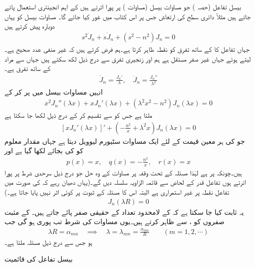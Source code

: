 بیسل تفاعل (حصہ )  جو مساوات بیسل (مساوات  ) پر پورا اترتے ہیں کے  اہم انجینئری استعمال پائے جاتے ہیں مثلاً دائری سطح کی ارتعاش جس پر اس کتاب میں غور کیا جائے گا۔ مساوات بیسل کو یہاں دوبارہ پیش کرتے ہیں
\begin{align*}
s^2\ddot{J}_n+s\dot{J}_n+(s^2-n^2)J_n=0
\end{align*}
جہاں تفاعل کا  کے ساتھ تفرق کو نقطہ ظاہر کرتا ہے۔ہم فرض کرتے ہیں کہ  غیر منفی عدد صحیح ہے۔  لیتے ہوئے جہاں  غیر صفر مستقل ہے ہم  اور زنجیری تفرق سے درج ذیل لکھ سکتے ہیں جہاں  سے مراد  کے ساتھ تفرق ہے۔
\begin{align*}
\dot{J}_n=\frac{J_n'}{\lambda}, \quad \ddot{J}_n=\frac{J_n''}{\lambda^2}
\end{align*}
انہیں مساوات بیسل میں پر کر کے
\begin{align*}
x^2J_n''(\lambda x)+xJ_n'(\lambda x)+(\lambda^2 x^2-n^2)J_n(\lambda x)=0
\end{align*}
ملتا ہے جس کو  سے تقسیم کر کے درج ذیل لکھا جا سکتا ہے
\begin{align}\label{مساوات_طاقتی_بیسل_سٹیورم_الف}
[xJ_n'(\lambda x)]'+\left(-\frac{n^2}{x}+\lambda^2 x\right)J_n(\lambda x)=0
\end{align}
جو  کی ہر معین قیمت کے لئے ایک مساوات سٹیورم لیوویل دیتا ہے جہاں مقدار معلوم کو  کی بجائے  لکھا گیا ہے اور 
\begin{align*}
p(x)=x,\quad q(x)=-\frac{n^2}{x},\quad r(x)=x
\end{align*}
ہیں۔چونکہ  پر  ہے لہٰذا مسئلہ  کے تحت وقفہ  پر مساوات  کے وہ حل جو درج ذیل سرحدی شرط پر پورا اترتے ہوں تفاعل قدر  کے لحاض سے  قائمہ الزاویہ سلسلہ دیں گے۔(یہاں دھیان رہے کہ  کی صورت میں تفاعل  نقطہ  پر غیر استمراری ہے البتہ اس کا مسئلہ  کے ثبوت پر کوئی اثر نہیں پایا جاتا ہے۔)
\begin{align}\label{مساوات_طاقتی_بیسل_سٹیورم_ب}
J_n(\lambda R)=0
\end{align}
یہ ثابت کیا جا سکتا ہے کہ  کے لامحدود تعداد کے حقیقی صفر پائے جاتے ہیں۔  کے مثبت صفروں کو ، سے ظاہر کرتے ہیں۔یوں مساوات  کی شرط تب پوری ہو گی جب
\begin{align}
\lambda R=\alpha_{mn} \quad \implies \quad \lambda=\lambda_{mn}=\frac{\alpha_{mn}}{R} \quad \quad (m=1,2,\cdots)
\end{align}
ہو جس سے درج ذیل مسئلہ ملتا ہے۔

\quad بیسل تفاعل کی قائمیت\\

